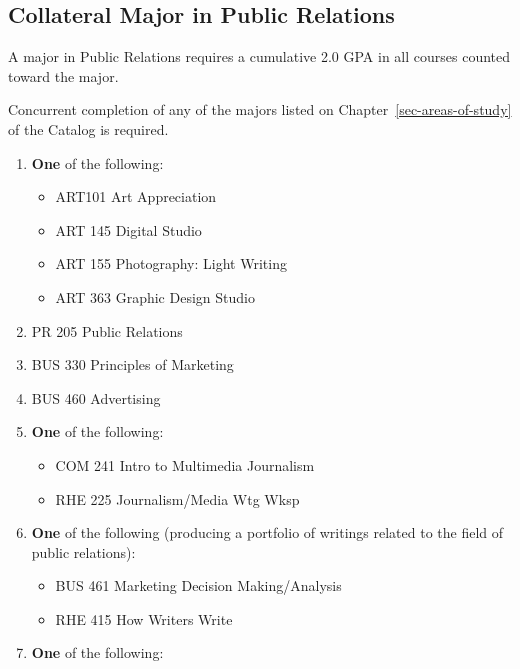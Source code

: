\documentclass[
  letterpaper,
]{scrbook}
\providecommand{\tightlist}{%
  \setlength{\itemsep}{0pt}\setlength{\parskip}{0pt}}
\begin{document}
\subsection{Collateral Major in Public
Relations}\label{collateral-major-in-public-relations}

A major in Public Relations requires a cumulative 2.0 GPA in all courses
counted toward the major.

Concurrent completion of any of the majors listed on
Chapter~\ref{sec-areas-of-study} of the Catalog is required.

\begin{enumerate}
\def\labelenumi{\arabic{enumi}.}
\item
  \textbf{One} of the following:

  \begin{itemize}
  \tightlist
  \item
    ART101 Art Appreciation
  \item
    ART 145 Digital Studio
  \item
    ART 155 Photography: Light Writing
  \item
    ART 363 Graphic Design Studio
  \end{itemize}
\item
  PR 205 Public Relations
\item
  BUS 330 Principles of Marketing
\item
  BUS 460 Advertising
\item
  \textbf{One} of the following:

  \begin{itemize}
  \tightlist
  \item
    COM 241 Intro to Multimedia Journalism
  \item
    RHE 225 Journalism/Media Wtg Wksp
  \end{itemize}
\item
  \textbf{One} of the following (producing a portfolio of writings
  related to the field of public relations):

  \begin{itemize}
  \tightlist
  \item
    BUS 461 Marketing Decision Making/Analysis
  \item
    RHE 415 How Writers Write
  \end{itemize}
\item
  \textbf{One} of the following:


\end{enumerate}
\end{document}
